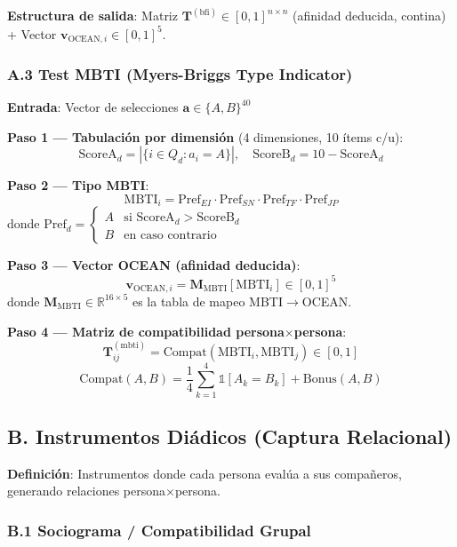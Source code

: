 \documentclass[12pt,a4paper]{article}
\begin{document}
\textbf{Estructura de salida}: Matriz $\mathbf{T}^{(\text{bfi})} \in [0,1]^{n \times n}$ (afinidad deducida, contina) + Vector $\mathbf{v}_{\text{OCEAN},i} \in [0,1]^5$.

\subsubsection{A.3 Test MBTI (Myers-Briggs Type Indicator)}

\begin{formulaBox}
\textbf{Entrada}: Vector de selecciones $\mathbf{a} \in \{A, B\}^{40}$

\textbf{Paso 1 --- Tabulación por dimensión} (4 dimensiones, 10 ítems c/u):
\[
\text{ScoreA}_d = |\{i \in Q_d : a_i = A\}|, \quad \text{ScoreB}_d = 10 - \text{ScoreA}_d
\]

\textbf{Paso 2 --- Tipo MBTI}:
\[
\text{MBTI}_i = \text{Pref}_{EI} \cdot \text{Pref}_{SN} \cdot \text{Pref}_{TF} \cdot \text{Pref}_{JP}
\]
donde $\text{Pref}_d = \begin{cases} A & \text{si ScoreA}_d > \text{ScoreB}_d \\ B & \text{en caso contrario} \end{cases}$

\textbf{Paso 3 --- Vector OCEAN (afinidad deducida)}:
\[
\mathbf{v}_{\text{OCEAN},i} = \mathbf{M}_{\text{MBTI}}[\text{MBTI}_i] \in [0,1]^5
\]
donde $\mathbf{M}_{\text{MBTI}} \in \mathbb{R}^{16 \times 5}$ es la tabla de mapeo MBTI$\to$OCEAN.

\textbf{Paso 4 --- Matriz de compatibilidad persona$\times$persona}:
\[
\mathbf{T}^{(\text{mbti})}_{ij} = \text{Compat}(\text{MBTI}_i, \text{MBTI}_j) \in [0, 1]
\]
\[
\text{Compat}(A, B) = \frac{1}{4}\sum_{k=1}^{4} \mathbb{1}[A_k = B_k] + \text{Bonus}(A, B)
\]
\end{formulaBox}

\subsection{B. Instrumentos Diádicos (Captura Relacional)}
\label{subsec:dyadic}

\textbf{Definición}: Instrumentos donde cada persona evalúa a sus compañeros, generando relaciones persona$\times$persona.

\subsubsection{B.1 Sociograma / Compatibilidad Grupal}
\end{document}
